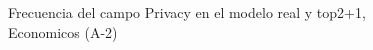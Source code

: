 \begin{figure}[H]
    \centering
    
    \caption{Frecuencia del campo Privacy en el modelo real y top2+1, Economicos (A-2)}
    \label{frecuency-Privacy-top2+1}
\end{figure}